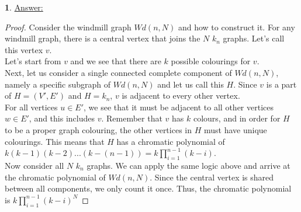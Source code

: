 \documentclass[12pt,a4paper]{article}
\theoremstyle{definition}
\newtheorem{problem}{}
\begin{document}
\begin{problem} \underline{Answer:}
\begin{proof} 
Consider the windmill graph $Wd(n, N)$ and how to construct it. For any windmill graph, there is a central vertex that joins the $N$ $k_n$ graphs. Let's call this vertex $v$. \\

Let's start from $v$ and we see that there are $k$ possible colourings for $v$. \\

Next, let us consider a single connected complete component of $Wd(n, N)$, namely a specific subgraph of $Wd(n, N)$ and let us call this $H$. Since $v$ is a part of $H = (V', E')$ and $H = k_n$, $v$ is adjacent to every other vertex. \\

For all vertices $u \in E'$, we see that it must be adjacent to all other vertices $w \in E'$, and this includes $v$. Remember that $v$ has $k$ colours, and in order for $H$ to be a proper graph colouring, the other vertices in $H$ must have unique colourings. This means that $H$ has a chromatic polynomial of $k(k - 1)(k - 2)...(k - (n - 1)) = k\prod_{i = 1}^{n - 1} (k - i)$. \\

Now consider all $N$ $k_n$ graphs. We can apply the same logic above and arrive at the chromatic polynomial of $Wd(n, N)$. Since the central vertex is shared between all components, we only count it once. Thus, the chromatic polynomial is $k\prod_{i = 1}^{n - 1} (k - i)^N$
\end{proof}
\end{problem}
\end{document}
